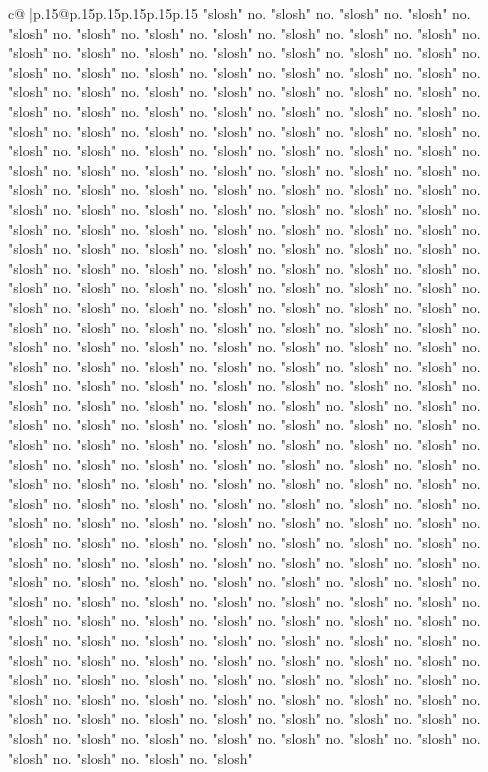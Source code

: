 \documentclass{article}
\begin{document}
{\begin{supertabular}{c@{$\;$}|p{.15\linewidth}@{}p{.15\linewidth}p{.15\linewidth}p{.15\linewidth}p{.15\linewidth}p{.15\linewidth}}
{{{"slosh" no. "slosh" no. "slosh" no. "slosh" no. "slosh" no. "slosh" no. "slosh" no. "slosh" no. "slosh" no. "slosh" no. "slosh" no. "slosh" no. "slosh" no. "slosh" no. "slosh" no. "slosh" no. "slosh" no. "slosh" no. "slosh" no. "slosh" no. "slosh" no. "slosh" no. "slosh" no. "slosh" no. "slosh" no. "slosh" no. "slosh" no. "slosh" no. "slosh" no. "slosh" no. "slosh" no. "slosh" no. "slosh" no. "slosh" no. "slosh" no. "slosh" no. "slosh" no. "slosh" no. "slosh" no. "slosh" no. "slosh" no. "slosh" no. "slosh" no. "slosh" no. "slosh" no. "slosh" no. "slosh" no. "slosh" no. "slosh" no. "slosh" no. "slosh" no. "slosh" no. "slosh" no. "slosh" no. "slosh" no. "slosh" no. "slosh" no. "slosh" no. "slosh" no. "slosh" no. "slosh" no. "slosh" no. "slosh" no. "slosh" no. "slosh" no. "slosh" no. "slosh" no. "slosh" no. "slosh" no. "slosh" no. "slosh" no. "slosh" no. "slosh" no. "slosh" no. "slosh" no. "slosh" no. "slosh" no. "slosh" no. "slosh" no. "slosh" no. "slosh" no. "slosh" no. "slosh" no. "slosh" no. "slosh" no. "slosh" no. "slosh" no. "slosh" no. "slosh" no. "slosh" no. "slosh" no. "slosh" no. "slosh" no. "slosh" no. "slosh" no. "slosh" no. "slosh" no. "slosh" no. "slosh" no. "slosh" no. "slosh" no. "slosh" no. "slosh" no. "slosh" no. "slosh" no. "slosh" no. "slosh" no. "slosh" no. "slosh" no. "slosh" no. "slosh" no. "slosh" no. "slosh" no. "slosh" no. "slosh" no. "slosh" no. "slosh" no. "slosh" no. "slosh" no. "slosh" no. "slosh" no. "slosh" no. "slosh" no. "slosh" no. "slosh" no. "slosh" no. "slosh" no. "slosh" no. "slosh" no. "slosh" no. "slosh" no. "slosh" no. "slosh" no. "slosh" no. "slosh" no. "slosh" no. "slosh" no. "slosh" no. "slosh" no. "slosh" no. "slosh" no. "slosh" no. "slosh" no. "slosh" no. "slosh" no. "slosh" no. "slosh" no. "slosh" no. "slosh" no. "slosh" no. "slosh" no. "slosh" no. "slosh" no. "slosh" no. "slosh" no. "slosh" no. "slosh" no. "slosh" no. "slosh" no. "slosh" no. "slosh" no. "slosh" no. "slosh" no. "slosh" no. "slosh" no. "slosh" no. "slosh" no. "slosh" no. "slosh" no. "slosh" no. "slosh" no. "slosh" no. "slosh" no. "slosh" no. "slosh" no. "slosh" no. "slosh" no. "slosh" no. "slosh" no. "slosh" no. "slosh" no. "slosh" no. "slosh" no. "slosh" no. "slosh" no. "slosh" no. "slosh" no. "slosh" no. "slosh" no. "slosh" no. "slosh" no. "slosh" no. "slosh" no. "slosh" no. "slosh" no. "slosh" no. "slosh" no. "slosh" no. "slosh" no. "slosh" no. "slosh" no. "slosh" no. "slosh" no. "slosh" no. "slosh" no. "slosh" no. "slosh" no. "slosh" no. "slosh" no. "slosh" no. "slosh" no. "slosh" no. "slosh" no. "slosh" no. "slosh" no. "slosh" no. "slosh" no. "slosh" no. "slosh" no. "slosh" no. "slosh" no. "slosh" no. "slosh" no. "slosh" no. "slosh" no. "slosh" no. "slosh" no. "slosh" no. "slosh" no. "slosh" no. "slosh" no. "slosh" no. "slosh" no. "slosh" no. "slosh" no. "slosh" no. "slosh" no. "slosh" no. "slosh" no. "slosh" no. "slosh" no. "slosh" no. "slosh" no. "slosh" no. "slosh" no. "slosh" no. "slosh" no. "slosh" no. "slosh" no. "slosh" no. "slosh" no. "slosh" no. "slosh" no. "slosh" no. "slosh" no. "slosh" no. "slosh" no. "slosh" no. "slosh" no. "slosh" no. "slosh" no. "slosh" no. "slosh" no. "slosh" no. "slosh" no. "slosh" no. "slosh" }}}
\end{supertabular}}
\end{document}
